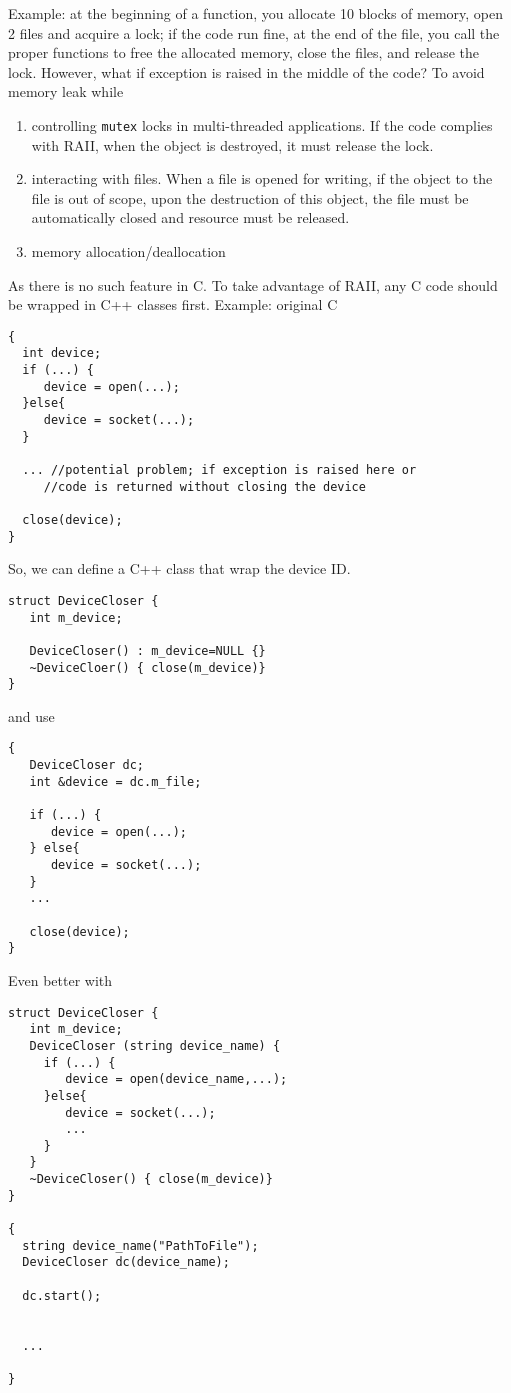 Example: at the beginning of a function, you allocate 10 blocks of memory, open
  2 files and acquire a lock; if the code run fine, at the end of the file,
  you call the proper functions to free the allocated memory, close the files,
  and release the lock. However, what if exception is raised in the middle of
  the code? To avoid memory leak while
\begin{enumerate}
  \item  controlling \verb!mutex! locks in multi-threaded applications. If the
  code complies with RAII, when the object is destroyed, it must release the lock.
  \item interacting with files. When a file is opened for writing, if the object
  to the file is out of scope, upon the destruction of this object, the file
  must be automatically closed and resource must be released.
  \item memory allocation/deallocation
\end{enumerate}
% 

As there is no such feature in C. To take advantage of RAII, any C code should be
wrapped in C++ classes first. Example: original C
\begin{lstlisting}
{ 
  int device;
  if (...) {
     device = open(...);
  }else{
     device = socket(...);
  }

  ... //potential problem; if exception is raised here or
     //code is returned without closing the device 
    
  close(device);
}
\end{lstlisting}
So, we can define a C++ class that wrap the device ID.
\begin{lstlisting}
struct DeviceCloser {
   int m_device;
   
   DeviceCloser() : m_device=NULL {}
   ~DeviceCloer() { close(m_device)}
}   
\end{lstlisting}
and use
\begin{lstlisting}
{ 
   DeviceCloser dc;
   int &device = dc.m_file;
   
   if (...) {
      device = open(...);
   } else{
      device = socket(...);
   }
   ...
   
   close(device);
}
\end{lstlisting}
Even better with
\begin{lstlisting}
struct DeviceCloser {
   int m_device;
   DeviceCloser (string device_name) {
     if (...) {
        device = open(device_name,...);
     }else{
        device = socket(...);
        ...
     }
   }
   ~DeviceCloser() { close(m_device)}
}

{
  string device_name("PathToFile");
  DeviceCloser dc(device_name);
  
  dc.start();
  
  
  ...
  
}
\end{lstlisting}

